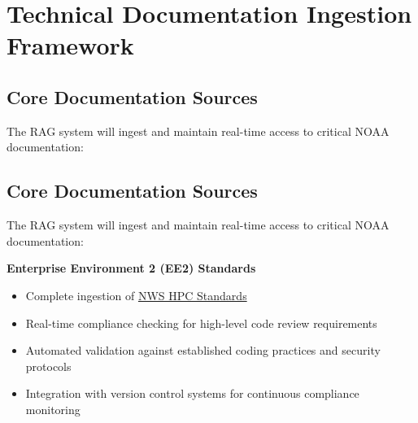 \documentclass[11pt,letterpaper]{article}
\begin{document}
\section{Technical Documentation Ingestion Framework}

\subsection{Core Documentation Sources}
The RAG system will ingest and maintain real-time access to critical NOAA documentation:

\subsection{Core Documentation Sources}
The RAG system will ingest and maintain real-time access to critical NOAA documentation:

\begin{center}
\end{center}

\textbf{Enterprise Environment 2 (EE2) Standards}
\begin{itemize}
    \item Complete ingestion of \href{https://nws-hpc-standards.readthedocs.io/en/latest/standards.html}{NWS HPC Standards}
    \item Real-time compliance checking for high-level code review requirements
    \item Automated validation against established coding practices and security protocols
    \item Integration with version control systems for continuous compliance monitoring
\end{itemize}
\end{document}
